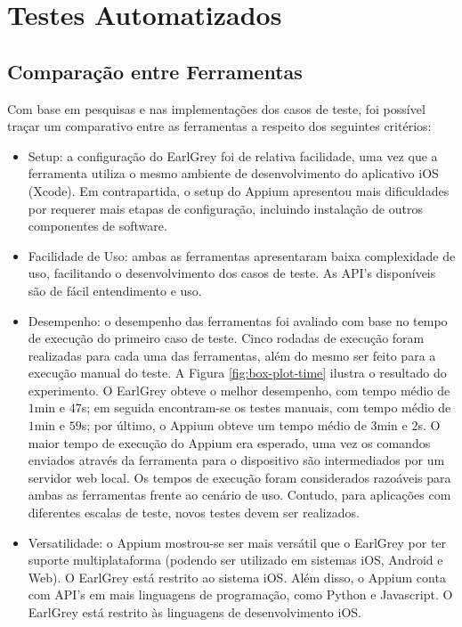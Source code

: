 \section{Testes Automatizados}
\subsection{Comparação entre Ferramentas}
Com base em pesquisas e nas implementações dos casos de teste, foi possível traçar um comparativo entre as ferramentas a respeito dos seguintes critérios:

\begin{itemize}
    \item Setup: a configuração do EarlGrey foi de relativa facilidade, uma vez que a ferramenta utiliza o mesmo ambiente de desenvolvimento do aplicativo iOS (Xcode). Em contrapartida, o setup do Appium apresentou mais dificuldades por requerer mais etapas de configuração, incluindo instalação de outros componentes de software.
    \item Facilidade de Uso: ambas as ferramentas apresentaram baixa complexidade de uso, facilitando o desenvolvimento dos casos de teste. As API's disponíveis são de fácil entendimento e uso. 
    \item Desempenho: o desempenho das ferramentas foi avaliado com base no tempo de execução do primeiro caso de teste. Cinco rodadas de execução foram realizadas para cada uma das ferramentas, além do mesmo ser feito para a execução manual do teste. A Figura \ref{fig:box-plot-time} ilustra o resultado do experimento. O EarlGrey obteve o melhor desempenho, com tempo médio de $1$min e $47$s; em seguida encontram-se os testes manuais, com tempo médio de $1$min e $59$s; por último, o Appium obteve um tempo médio de $3$min e $2$s. O maior tempo de execução do Appium era esperado, uma vez os comandos enviados através da ferramenta para o dispositivo são intermediados por um servidor web local. Os tempos de execução foram considerados razoáveis para ambas as ferramentas frente ao cenário de uso. Contudo, para aplicações com diferentes escalas de teste, novos testes devem ser realizados.
    \item Versatilidade: o Appium mostrou-se ser mais versátil que o EarlGrey por ter suporte multiplataforma (podendo ser utilizado em sistemas iOS, Android e Web). O EarlGrey está restrito ao sistema iOS. Além disso, o Appium conta com API's em mais linguagens de programação, como Python e Javascript. O EarlGrey está restrito às linguagens de desenvolvimento iOS.
\end{itemize}

